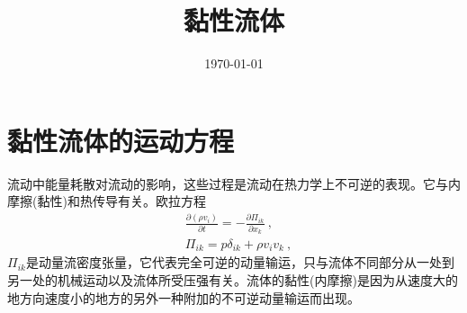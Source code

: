 \documentclass[12pt,a4paper]{article}
\title{黏性流体}
\author{}
\date{\today}
\begin{document}
\maketitle

\section{黏性流体的运动方程}
流动中能量耗散对流动的影响，这些过程是流动在热力学上不可逆的表现。它与内摩擦(黏性)和热传导有关。欧拉方程
\begin{align*}
& \frac{\partial (\rho v_i)}{\partial t} = -\frac{\partial \Pi_{ik} }{\partial x_k} ~, \\
& \Pi_{ik} = p\delta_{ik} +\rho v_i v_k ~,
\end{align*}
$\Pi_{ik}$是动量流密度张量，它代表完全可逆的动量输运，只与流体不同部分从一处到另一处的机械运动以及流体所受压强有关。流体的黏性(内摩擦)是因为从速度大的地方向速度小的地方的另外一种附加的不可逆动量输运而出现。
\end{document}
